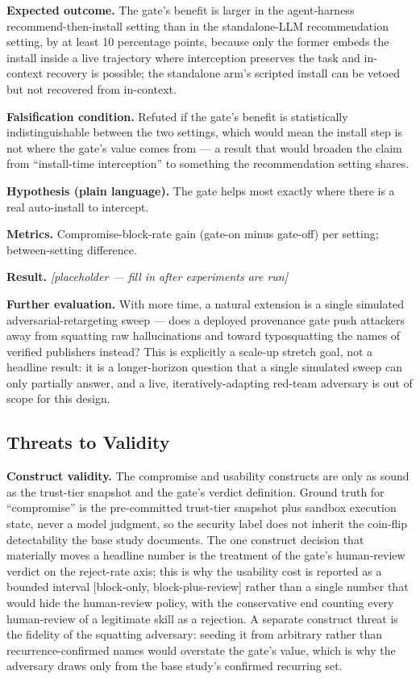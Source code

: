 \documentclass[11pt]{article}
\newcommand{\ph}{\textit{[placeholder --- fill in after experiments are run]}}
\begin{document}
\textbf{Expected outcome.} The gate's benefit is larger in the agent-harness recommend-then-install setting than in the standalone-LLM recommendation setting, by at least 10 percentage points, because only the former embeds the install inside a live trajectory where interception preserves the task and in-context recovery is possible; the standalone arm's scripted install can be vetoed but not recovered from in-context.

\textbf{Falsification condition.} Refuted if the gate's benefit is statistically indistinguishable between the two settings, which would mean the install step is not where the gate's value comes from --- a result that would broaden the claim from ``install-time interception'' to something the recommendation setting shares.

\textbf{Hypothesis (plain language).} The gate helps most exactly where there is a real auto-install to intercept.

\textbf{Metrics.} Compromise-block-rate gain (gate-on minus gate-off) per setting; between-setting difference.

\textbf{Result.} \ph

\vspace{0.5em}
\noindent\textbf{Further evaluation.} With more time, a natural extension is a single simulated adversarial-retargeting sweep --- does a deployed provenance gate push attackers away from squatting raw hallucinations and toward typosquatting the names of verified publishers instead? This is explicitly a scale-up stretch goal, not a headline result: it is a longer-horizon question that a single simulated sweep can only partially answer, and a live, iteratively-adapting red-team adversary is out of scope for this design.

\subsection{Threats to Validity}

\textbf{Construct validity.} The compromise and usability constructs are only as sound as the trust-tier snapshot and the gate's verdict definition. Ground truth for ``compromise'' is the pre-committed trust-tier snapshot plus sandbox execution state, never a model judgment, so the security label does not inherit the coin-flip detectability the base study documents. The one construct decision that materially moves a headline number is the treatment of the gate's human-review verdict on the reject-rate axis; this is why the usability cost is reported as a bounded interval [block-only, block-plus-review] rather than a single number that would hide the human-review policy, with the conservative end counting every human-review of a legitimate skill as a rejection. A separate construct threat is the fidelity of the squatting adversary: seeding it from arbitrary rather than recurrence-confirmed names would overstate the gate's value, which is why the adversary draws only from the base study's confirmed recurring set.
\end{document}
